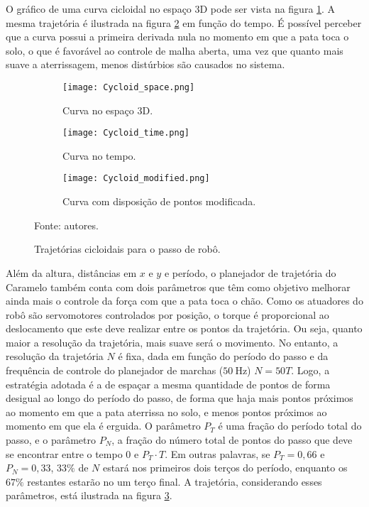 \documentclass[conference]{IEEEtran}
\begin{document}
O gráfico de uma curva cicloidal no espaço 3D pode ser vista na figura \ref{fig:traj_space}. A mesma trajetória é ilustrada na figura \ref{fig:traj_time} em função do tempo. É possível perceber que a curva possui a primeira derivada nula no momento em que a pata toca o solo, o que é favorável ao controle de malha aberta, uma vez que quanto mais suave a aterrissagem, menos distúrbios são causados no sistema.

\begin{figure*}[h]
    \centering
    \begin{subfigure}[t]{0.32\textwidth}
      \centering
      \texttt{[image: Cycloid\_space.png]}
      \caption{Curva no espaço 3D.}
      \label{fig:traj_space}
    \end{subfigure}
    \begin{subfigure}[t]{0.32\textwidth}
      \centering
      \texttt{[image: Cycloid\_time.png]}
      \caption{Curva no tempo.}
      \label{fig:traj_time}
    \end{subfigure}
    \begin{subfigure}[t]{0.32\textwidth}
      \centering
      \texttt{[image: Cycloid\_modified.png]}
      \caption{Curva com disposição de pontos modificada.}
      \label{fig:traj_time_modified}
    \end{subfigure}
    \vfill
    \caption{Trajetórias cicloidais para o passo de robô.}
    Fonte: autores.
    \label{fig:traj_curve}
\end{figure*}

Além da altura, distâncias em $x$ e $y$ e período, o planejador de trajetória do Caramelo também conta com dois parâmetros que têm como objetivo melhorar ainda mais o controle da força com que a pata toca o chão. Como os atuadores do robô são servomotores controlados por posição, o torque é proporcional ao deslocamento que este deve realizar entre os pontos da trajetória. Ou seja, quanto maior a resolução da trajetória, mais suave será o movimento. No entanto, a resolução da trajetória $N$ é fixa, dada em função do período do passo e da frequência de controle do planejador de marchas ($\SI{50}{\hertz}$) $N = 50T$. Logo, a estratégia adotada é a de espaçar a mesma quantidade de pontos de forma desigual ao longo do período do passo, de forma que haja mais pontos próximos ao momento em que a pata aterrissa no solo, e menos pontos próximos ao momento em que ela é erguida. O parâmetro $P_T$ é uma fração do período total do passo, e o parâmetro $P_N$, a fração do número total de pontos do passo que deve se encontrar entre o tempo $0$ e $P_T \cdot T$. Em outras palavras, se $P_T = 0,66$ e $P_N = 0,33$, $33\%$ de $N$ estará nos primeiros dois terços do período, enquanto os $67\%$ restantes estarão no um terço final. A trajetória, considerando esses parâmetros, está ilustrada na figura \ref{fig:traj_time_modified}.
\end{document}
